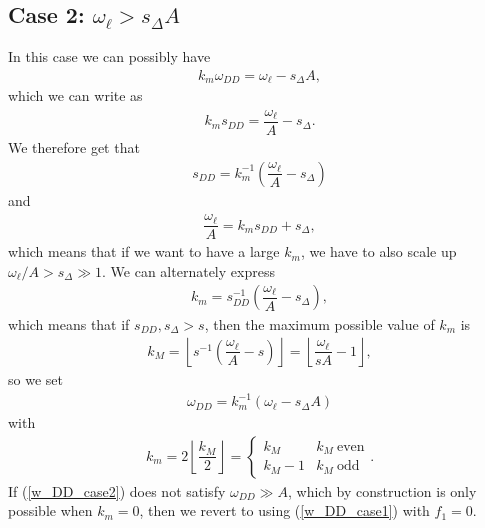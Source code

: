 \documentclass[11pt]{article}
\renewcommand{\t}{\text} %
\newcommand{\f}[2]{\dfrac{#1}{#2}} %
\newcommand{\p}[1]{\left(#1\right)} %
\renewcommand{\l}{\ell} %
\newcommand{\floor}[1]{\left\lfloor{#1}\right\rfloor}
\begin{document}
\subsection*{Case 2: $\omega_\l > s_\Delta A$}
In this case we can possibly have
\begin{align}
  k_m\omega_{DD}=\omega_\l-s_\Delta A,
\end{align}
which we can write as
\begin{align}
  k_m s_{DD}=\f{\omega_\l}{A}-s_\Delta.
\end{align}
We therefore get that
\begin{align}
  s_{DD}=k_m^{-1}\p{\f{\omega_\l}{A}-s_\Delta}
\end{align}
and
\begin{align}
  \f{\omega_\l}{A}=k_m s_{DD}+s_\Delta,
\end{align}
which means that if we want to have a large $k_m$, we have to also
scale up $\omega_\l/A>s_\Delta\gg1$. We can alternately express
\begin{align}
  k_m=s_{DD}^{-1}\p{\f{\omega_\l}{A}-s_\Delta},
\end{align}
which means that if $s_{DD},s_\Delta>s$, then the maximum possible
value of $k_m$ is
\begin{align}
  k_M=\floor{s^{-1}\p{\f{\omega_\l}{A}-s}}
  =\floor{\f{\omega_\l}{sA}-1},
  \label{k_M}
\end{align}
so we set
\begin{align}
  \omega_{DD}=k_m^{-1}\p{\omega_\l-s_\Delta A}
  \label{w_DD_case2}
\end{align}
with
\begin{align}
  k_m=2\floor{\f{k_M}2}=\left\{
    \begin{array}{ll}
      k_M & k_M~\t{even} \\
      k_M-1 & k_M~\t{odd}
    \end{array}\right..
\end{align}
If (\ref{w_DD_case2}) does not satisfy $\omega_{DD}\gg A$, which by
construction is only possible when $k_m=0$, then we revert to using
(\ref{w_DD_case1}) with $f_1=0$.
\end{document}
